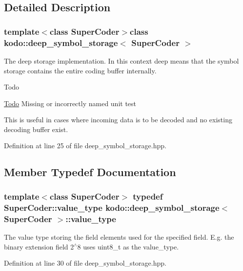 \subsection{Detailed Description}
\subsubsection*{template$<$class Super\-Coder$>$class kodo\-::deep\-\_\-symbol\-\_\-storage$<$ Super\-Coder $>$}

The deep storage implementation. In this context deep means that the symbol storage contains the entire coding buffer internally. 

\begin{DoxyRefDesc}{Todo}
\item[\hyperlink{todo__todo000008}{Todo}]Missing or incorrectly named unit test\end{DoxyRefDesc}
This is useful in cases where incoming data is to be decoded and no existing decoding buffer exist. 

Definition at line 25 of file deep\-\_\-symbol\-\_\-storage.\-hpp.



\subsection{Member Typedef Documentation}
\hypertarget{classkodo_1_1deep__symbol__storage_ab362e1273dc5cd41dceca6e3ea9199c2}{
\subsubsection[{value\-\_\-type}]{\setlength{\rightskip}{0pt plus 5cm}template$<$class Super\-Coder$>$ typedef Super\-Coder\-::value\-\_\-type {\bf kodo\-::deep\-\_\-symbol\-\_\-storage}$<$ Super\-Coder $>$\-::{\bf value\-\_\-type}}}\label{classkodo_1_1deep__symbol__storage_ab362e1273dc5cd41dceca6e3ea9199c2}




The value type storing the field elements used for the specified field. E.\-g. the binary extension field 2$^\wedge$8 uses uint8\-\_\-t as the value\-\_\-type. 

Definition at line 30 of file deep\-\_\-symbol\-\_\-storage.\-hpp.



